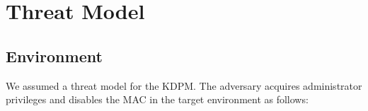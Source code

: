 \section{Threat Model} \label{seciton:threatmodel}
\subsection{Environment}


We assumed a threat model for the KDPM.
%
The adversary acquires administrator privileges and disables the MAC in the
target environment as follows:


